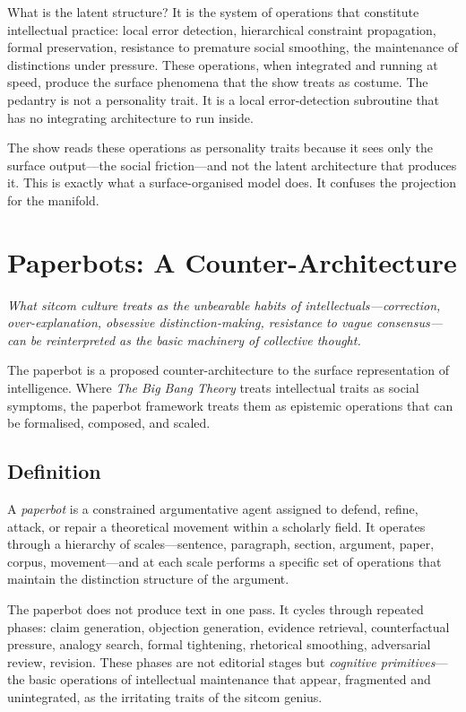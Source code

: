 \documentclass[12pt, letterpaper]{article}
\theoremstyle{remark}
\newcommand{\BBT}{\textit{The Big Bang Theory}}
\begin{document}
What is the latent structure?  It is the system of operations that constitute
intellectual practice: local error detection, hierarchical constraint
propagation, formal preservation, resistance to premature social smoothing,
the maintenance of distinctions under pressure.  These operations, when
integrated and running at speed, produce the surface phenomena that the show
treats as costume.  The pedantry is not a personality trait.  It is a local
error-detection subroutine that has no integrating architecture to run inside.

The show reads these operations as personality traits because it sees only
the surface output---the social friction---and not the latent architecture
that produces it.  This is exactly what a surface-organised model does.  It
confuses the projection for the manifold.

\section{Paperbots: A Counter-Architecture}

\epigraph{\itshape What sitcom culture treats as the unbearable habits of
intellectuals---correction, over-explanation, obsessive
distinction-making, resistance to vague consensus---can be
reinterpreted as the basic machinery of collective thought.}{}

The paperbot is a proposed counter-architecture to the surface representation
of intelligence.  Where \BBT{} treats intellectual traits as social symptoms,
the paperbot framework treats them as epistemic operations that can be
formalised, composed, and scaled.

\subsection{Definition}

A \emph{paperbot} is a constrained argumentative agent assigned to defend,
refine, attack, or repair a theoretical movement within a scholarly field.
It operates through a hierarchy of scales---sentence, paragraph, section,
argument, paper, corpus, movement---and at each scale performs a specific
set of operations that maintain the distinction structure of the argument.

The paperbot does not produce text in one pass.  It cycles through repeated
phases: claim generation, objection generation, evidence retrieval,
counterfactual pressure, analogy search, formal tightening, rhetorical
smoothing, adversarial review, revision.  These phases are not editorial
stages but \emph{cognitive primitives}---the basic operations of intellectual
maintenance that appear, fragmented and unintegrated, as the irritating
traits of the sitcom genius.
\end{document}
